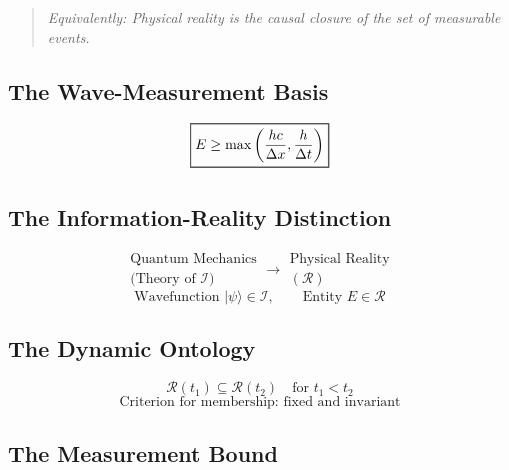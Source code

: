\documentclass[aps,preprint,showpacs,showkeys]{revtex4}
\begin{document}
\begin{quote}
\emph{Equivalently: Physical reality is the causal closure of the set of
measurable events.}
\end{quote}

\subsection{The Wave-Measurement Basis}

\begin{equation}
\frame{\boxed{E \ge \max\left(\frac{hc}{\Delta x}, \frac{h}{\Delta t}\right)}%
}
\end{equation}

\subsection{The Information-Reality Distinction}

\begin{equation}
\boxed{ \begin{array}{c} \text{Quantum Mechanics} \\ \text{(Theory of }
\mathcal{I} \text{)} \end{array} \longrightarrow \begin{array}{c}
\text{Physical Reality} \\ (\mathcal{R}) \end{array} }
\end{equation}
\begin{equation}
\text{Wavefunction } |\psi\rangle \in \mathcal{I}, \qquad \text{Entity } E
\in \mathcal{R}
\end{equation}

\subsection{The Dynamic Ontology}

\begin{equation}
\mathcal{R}(t_1) \subseteq \mathcal{R}(t_2) \quad \text{for } t_1 < t_2
\end{equation}
\begin{equation}
\text{Criterion for membership: fixed and invariant}
\end{equation}

\subsection{The Measurement Bound}
\end{document}
